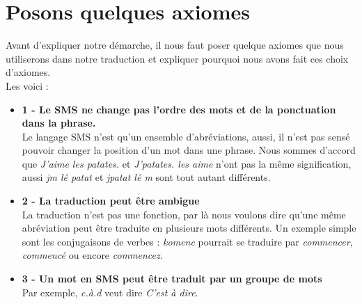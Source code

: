 \documentclass[11pt]{report}
\begin{document}
	\section{Posons quelques axiomes}
	Avant d'expliquer notre démarche, il nous faut poser quelque axiomes que nous utiliserons dans notre traduction et expliquer pourquoi nous avons fait ces choix d'axiomes.\\
	Les voici : \\
	\begin{itemize}
		\item \textbf{1 - Le SMS ne change pas l'ordre des mots et de la ponctuation dans la phrase.}\\
		Le langage SMS n'est qu'un ensemble d'abréviations, aussi, il n'est pas sensé pouvoir changer la position d'un mot dans une phrase. Nous sommes d'accord que {\em J'aime les patates.} et {\em J'patates. les aime} n'ont pas la même signification, aussi {\em jm lé patat} et {\em jpatat lé m} sont tout autant différents.\\
		
		\item \textbf{2 - La traduction peut être ambigue}\\
		La traduction n'est pas une fonction, par là nous voulons dire qu'une même abréviation peut être traduite en plusieurs mots différents. Un exemple simple sont les conjugaisons de verbes : {\em komenc} pourrait se traduire par {\em commencer}, {\em commencé} ou encore {\em commencez}.\\
		
		\item \textbf{3 - Un mot en SMS peut être traduit par un groupe de mots}\\
		Par exemple, {\em c.à.d} veut dire {\em C'est à dire}.\\
		

\end{itemize}
\end{document}

